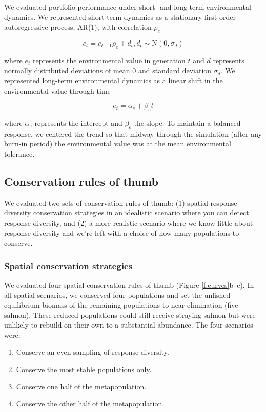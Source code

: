 We evaluated portfolio performance under short- and long-term
environmental dynamics. We represented short-term dynamics as a
stationary first-order autoregressive process, AR(1), with correlation
$\rho_e$

\begin{equation}
  e_t = e_{t-1} \rho_e + d_t, d_t \sim \mathrm{N}(0, \sigma_d)
\end{equation}

\noindent where $e_t$ represents the environmental value in generation
$t$ and $d$ represents normally distributed deviations of mean 0 and
standard deviation $\sigma_d$. We represented long-term environmental
dynamics as a linear shift in the environmental value through time

\begin{equation}
  e_t = \alpha_e + \beta_e t
\end{equation}

\noindent where $\alpha_e$ represents the intercept and $\beta_e$ the
slope. To maintain a balanced response, we centered the trend so that
midway through the simulation (after any burn-in period) the
environmental value was at the mean environmental tolerance.

\subsection{Conservation rules of thumb}

We evaluated two sets of conservation rules of thumb: (1) spatial
response diversity conservation strategies in an idealistic scenario
where you can detect response diversity, and (2) a more realistic
scenario where we know little about response diversity and we're left
with a choice of how many populations to conserve.

\subsubsection{Spatial conservation strategies}

We evaluated four spatial conservation rules of thumb (Figure
\ref{f:curves}b--e). In all spatial scenarios, we conserved four
populations and set the unfished equilibrium biomass of the remaining
populations to near elimination (five salmon). These reduced populations
could still receive straying salmon but were unlikely to rebuild on
their own to a substantial abundance. The four scenarios were:

\begin{enumerate}
\def\labelenumi{\arabic{enumi}.}
\itemsep1pt\parskip0pt
\item
  Conserve an even sampling of response diversity.
\item
  Conserve the most stable populations only.
\item
  Conserve one half of the metapopulation.
\item
  Conserve the other half of the metapopulation.
\end{enumerate}

